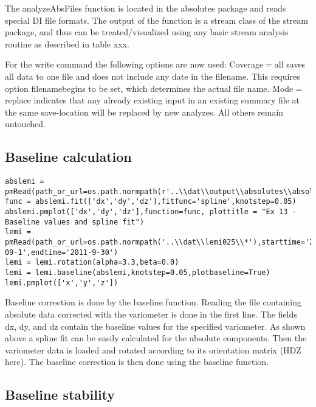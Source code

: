 The analyzeAbsFiles function is located in the absolutes package and reads special DI file formats. The output of the function is a stream class of the stream package, and thus can be treated/visualized using any basic stream analysis routine as described in table xxx.

For the write command the following options are now used: Coverage$=$all saves all data to one file and does not include any date in the filename. This requires option filenamebegins to be set, which determines the actual file name. Mode$=$replace indicates that any already existing input in an existing summary file at the same save-location will be replaced by new analyzes. All others remain untouched.


\subsection{Baseline calculation}
\begin{verbatim}
abslemi = pmRead(path_or_url=os.path.normpath(r'..\\dat\\output\\absolutes\\absolutes_lemi.txt'))
func = abslemi.fit(['dx','dy','dz'],fitfunc='spline',knotstep=0.05)
abslemi.pmplot(['dx','dy','dz'],function=func, plottitle = "Ex 13 - Baseline values and spline fit")
lemi = pmRead(path_or_url=os.path.normpath('..\\dat\\lemi025\\*'),starttime='2011-09-1',endtime='2011-9-30')
lemi = lemi.rotation(alpha=3.3,beta=0.0)
lemi = lemi.baseline(abslemi,knotstep=0.05,plotbaseline=True)
lemi.pmplot(['x','y','z'])
\end{verbatim}

Baseline correction is done by the baseline function. Reading the file containing absolute data corrected with the variometer is done in the first line. The fields dx, dy, and dz contain the baseline values for the specified variometer. As shown above a spline fit can be easily calculated for the absolute components. Then the variometer data is loaded and rotated according to its orientation matrix (HDZ here). The baseline correction is then done using the baseline function.


\subsection{Baseline stability}


